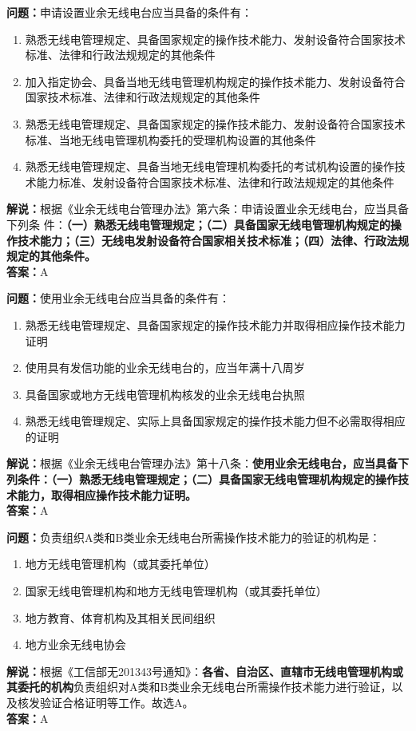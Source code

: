 \textbf{问题：}申请设置业余无线电台应当具备的条件有：
\begin{enumerate}[label=\Alph*), leftmargin=1cm]
	\item 熟悉无线电管理规定、具备国家规定的操作技术能力、发射设备符合国家技术标准、法律和行政法规规定的其他条件
	\item 加入指定协会、具备当地无线电管理机构规定的操作技术能力、发射设备符合国家技术标准、法律和行政法规规定的其他条件
	\item 熟悉无线电管理规定、具备国家规定的操作技术能力、发射设备符合国家技术标准、当地无线电管理机构委托的受理机构设置的其他条件
	\item 熟悉无线电管理规定、具备当地无线电管理机构委托的考试机构设置的操作技术能力标准、发射设备符合国家技术标准、法律和行政法规规定的其他条件
\end{enumerate}
\textbf{解说：}根据《业余无线电台管理办法》第六条：申请设置业余无线电台，应当具备下列条
件：\textbf{（一）熟悉无线电管理规定；（二）具备国家无线电管理机构规定的操作技术能力；（三）无线电发射设备符合国家相关技术标准；（四）法律、行政法规规定的其他条件。}\\\textbf{答案：}A

\textbf{问题：}使用业余无线电台应当具备的条件有：
\begin{enumerate}[label=\Alph*), leftmargin=1cm]
	\item 熟悉无线电管理规定、具备国家规定的操作技术能力并取得相应操作技术能力证明
	\item 使用具有发信功能的业余无线电台的，应当年满十八周岁
	\item 具备国家或地方无线电管理机构核发的业余无线电台执照
	\item 熟悉无线电管理规定、实际上具备国家规定的操作技术能力但不必需取得相应的证明
\end{enumerate}
\textbf{解说：}根据《业余无线电台管理办法》第十八条：\textbf{使用业余无线电台，应当具备下列条件：（一）熟悉无线电管理规定；（二）具备国家无线电管理机构规定的操作技术能力，取得相应操作技术能力证明。}\\\textbf{答案：}A


\textbf{问题：}负责组织A类和B类业余无线电台所需操作技术能力的验证的机构是：
\begin{enumerate}[label=\Alph*), leftmargin=1cm]
	\item 地方无线电管理机构（或其委托单位）
	\item 国家无线电管理机构和地方无线电管理机构（或其委托单位）
	\item 地方教育、体育机构及其相关民间组织
	\item 地方业余无线电协会
\end{enumerate}
\textbf{解说：}根据《工信部无201343号通知》：\textbf{各省、自治区、直辖市无线电管理机构或其委托的机构}负责组织对A类和B类业余无线电台所需操作技术能力进行验证，以及核发验证合格证明等工作。故选A。\\\textbf{答案：}A

